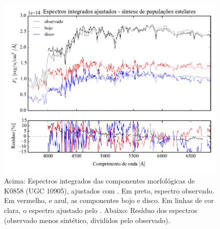 \begin{figure}
	\includegraphics[page=15,width=\textwidth]{figuras/sample006a_synthesis}
	\caption[Espectros ajustados com \starlight das componentes morfológicas de
	K0858 (UGC 10905)]
	{Acima: Espectros integrados das componentes morfológicas de
	K0858 (UGC 10905), ajustados com \starlight. Em preto, espectro observado. Em
	vermelho, e azul, as componentes bojo e disco. Em linhas de cor clara, o
	espectro ajustado pelo \starlight. Abaixo: Resíduo dos espectros (observado
	menos sintético, divididos pelo observado).}
	\label{fig:decompSintese:K0858}
\end{figure}

